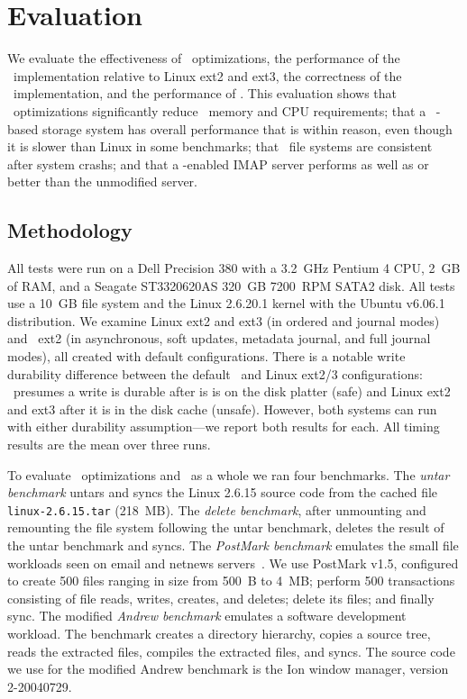 
\section {Evaluation}
\label{sec:evaluation}

We evaluate
%
the effectiveness of \patch\ optimizations,
%
the performance of the \Kudos\ implementation relative to Linux ext2
and ext3,
%
the correctness of the \Kudos\ implementation,
%
and the performance of \patchgroups.
%
This evaluation shows
%
that \patch\ optimizations significantly reduce \patch\ memory and CPU
requirements;
%
that a \Kudos\ \patch-based storage system has overall performance
that is within reason, even though it is slower than Linux in some
benchmarks;
%
that \Kudos\ file systems are consistent after system crashs;
%
and that a \patchgroup-enabled IMAP server performs as well as or
better than the unmodified server.

\subsection{Methodology}

All tests were run on a Dell Precision 380 with a 3.2~GHz Pentium 4
CPU, 2~GB of RAM, and a Seagate ST3320620AS 320~GB 7200~RPM SATA2 disk.
%
All tests use a 10~GB file system and the Linux 2.6.20.1 kernel
with the Ubuntu v6.06.1 distribution.
%
We examine Linux ext2 and ext3 (in ordered and journal modes) and
\Kudos\ ext2 (in asynchronous, soft updates, metadata journal, and
full journal modes), all created with default configurations.
%
There is a notable write durability difference between the default
\Kudos\ and Linux ext2/3 configurations: \Kudos\ presumes a write is
durable after is is on the disk platter (safe) and Linux ext2 and ext3
after it is in the disk cache (unsafe). However, both systems can run
with either durability assumption---we report both results for each.
%
All timing results are the mean over three runs.

To evaluate \patch\ optimizations and \Kudos\ as a whole we ran four
benchmarks.
%
The \emph{untar benchmark} untars and syncs the Linux 2.6.15 source code
from the cached file \texttt{linux-2.6.15.tar} (218~MB).
%
The \emph{delete benchmark}, after unmounting and remounting the file
system following the untar benchmark, deletes the result of the untar
benchmark and syncs.
%
The \emph{PostMark benchmark} emulates the small file workloads seen
on email and netnews servers~\cite{postmark}. We use PostMark v1.5,
configured to create 500 files ranging in size from 500~B to 4~MB;
perform 500 transactions consisting of file reads, writes, creates,
and deletes; delete its files; and finally sync.
%
The modified \emph{Andrew benchmark} emulates a software development
workload.  The benchmark creates a directory hierarchy, copies a
source tree, reads the extracted files, compiles the extracted files,
and syncs. The source code we use for the modified Andrew benchmark is
the Ion window manager, version 2-20040729.

